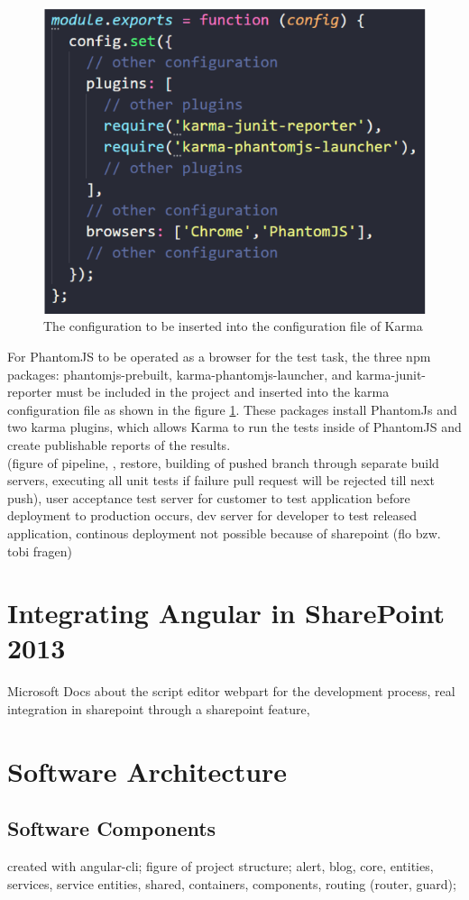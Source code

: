 \documentclass[Bachelor,BIF,english]{twbook}
\begin{document}
\begin{figure}[!htbp]
\centering
\includegraphics[width=0.5\linewidth]{PICs/karma_phantomjs.eps}
\caption{The configuration to be inserted into the configuration file of Karma}\label{Fig2}
\end{figure}
For PhantomJS to be operated as a browser for the test task, the three npm packages: phantomjs-prebuilt, karma-phantomjs-launcher, and karma-junit-reporter must be included in the project and inserted into the karma configuration file as shown in the figure \ref{Fig2}. These packages install PhantomJs and two karma plugins, which allows Karma to run the tests inside of PhantomJS and create publishable reports of the results.
\\[\baselineskip]
(figure of pipeline, \cite{Git}, restore, building of pushed branch through separate build servers, executing all unit tests if failure pull request will be rejected till next push), user acceptance test server for customer to test application before deployment to production occurs, dev server for developer to test released application, continous deployment not possible because of sharepoint (flo bzw. tobi fragen)

\section{Integrating Angular in SharePoint 2013}
Microsoft Docs about the script editor webpart for the development process, real integration in sharepoint through a sharepoint feature,

\section{Software Architecture}

\subsection{Software Components}
created with angular-cli;
figure of project structure;
alert, blog, core, entities, services, service entities, shared, containers, components, routing (router, guard); 
\end{document}

